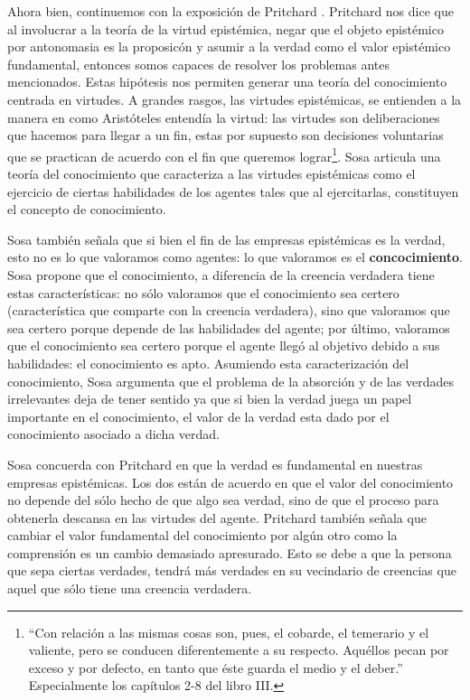 \documentclass[12pt]{article}
\begin{document}
Ahora bien, continuemos con la exposición de Pritchard \cite{Pritchard2021}. Pritchard nos dice que al involucrar a la teoría de la virtud epistémica, negar que el objeto epistémico por antonomasia es la proposicón y asumir a la verdad como el valor epistémico fundamental, entonces somos capaces de resolver los problemas antes mencionados. Estas hipótesis nos permiten generar una teoría del conocimiento centrada en virtudes. A grandes rasgos, las virtudes epistémicas, se entienden a la manera en como Aristóteles entendía la virtud: las virtudes son deliberaciones que hacemos para llegar a un fin, estas por supuesto son decisiones voluntarias que se practican de acuerdo con el fin que queremos lograr\footnote{``Con relación a las mismas cosas son, pues, el cobarde, el temerario y el valiente, pero se conducen diferentemente a su respecto. Aquéllos pecan por exceso y por defecto, en tanto que éste guarda el medio y el deber.'' \cite{aristotelesnico} Especialmente los capítulos 2-8 del libro III.}. Sosa \citeyear{Sosa2017-SOSE} articula una teoría del conocimiento que caracteriza a las virtudes epistémicas  como el ejercicio de ciertas habilidades de los agentes tales que al ejercitarlas, constituyen el concepto de conocimiento. 

Sosa también señala que si bien el fin de las empresas epistémicas es la verdad, esto no es lo que valoramos como agentes: lo que valoramos es el \textbf{concocimiento}. Sosa \citeyear[pp. 11-113]{Sosa2017-SOSE} propone que el conocimiento, a diferencia de la creencia verdadera tiene estas características: no sólo valoramos que el conocimiento sea certero (característica que comparte con la creencia verdadera), sino que valoramos que sea certero porque depende de las habilidades del agente; por último, valoramos que el conocimiento sea certero porque el agente llegó al objetivo debido a sus habilidades: el conocimiento es apto. Asumiendo esta caracterización del conocimiento, Sosa argumenta que el problema de la absorción y de las verdades irrelevantes deja de tener sentido ya que si bien la verdad juega un papel importante en el conocimiento, el valor de la verdad esta dado por el conocimiento asociado a dicha verdad.

Sosa concuerda con Pritchard en que la verdad es fundamental en nuestras empresas epistémicas. Los dos están de acuerdo en que el valor del conocimiento no depende del sólo hecho de que algo sea verdad, sino de que el proceso para obtenerla descansa en las virtudes del agente. Pritchard también señala que cambiar el valor fundamental del conocimiento por algún otro como la comprensión es un cambio demasiado apresurado. Esto se debe a que la persona que sepa ciertas verdades, tendrá más verdades en su vecindario de creencias que aquel que sólo tiene una creencia verdadera.
\end{document}
